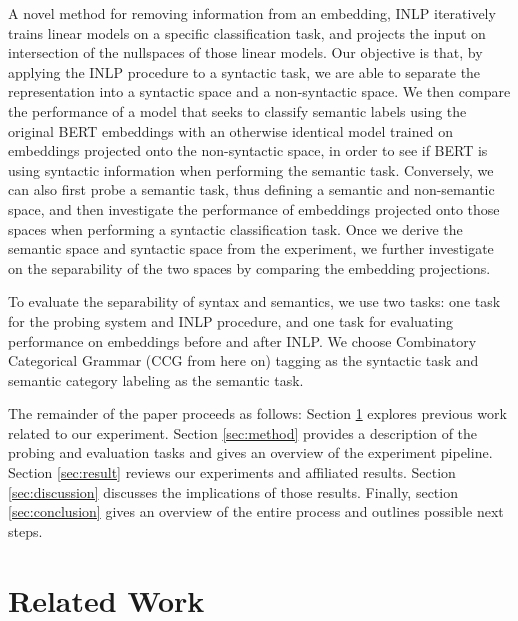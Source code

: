 \documentclass[11pt,a4paper]{article}
\begin{document}
A novel method for removing information from an embedding, INLP iteratively trains linear models on a specific classification task, and projects the input on intersection of the nullspaces of those linear models. Our objective is that, by applying the INLP procedure to a syntactic task, we are able to separate the representation into a syntactic space and a non-syntactic space. We then compare the performance of a model that seeks to classify semantic labels using the original BERT embeddings with an otherwise identical model trained on embeddings projected onto the non-syntactic space, in order to see if BERT is using syntactic information when performing the semantic task. Conversely, we can also first probe a semantic task, thus defining a semantic and non-semantic space, and then investigate the performance of embeddings projected onto those spaces when performing a syntactic classification task. Once we derive the semantic space and syntactic space from the experiment, we further investigate on the separability of the two spaces by comparing the embedding projections. %

To evaluate the separability of syntax and semantics, we use two tasks: one task for the probing system and INLP procedure, and one task for evaluating performance on embeddings before and after INLP. We choose Combinatory Categorical Grammar (CCG from here on) tagging \citep{ccg-bank} as the syntactic task and semantic category labeling \citep{propbank} as the semantic task. 

The remainder of the paper proceeds as follows: Section \ref{sec:related} explores previous work related to our experiment. Section \ref{sec:method} provides a description of the probing and evaluation tasks and gives an overview of the experiment pipeline. Section \ref{sec:result} reviews our experiments and affiliated results. Section \ref{sec:discussion} discusses the implications of those results. Finally, section \ref{sec:conclusion} gives an overview of the entire process and outlines possible next steps. 



\section{Related Work}
\label{sec:related}

\end{document}
